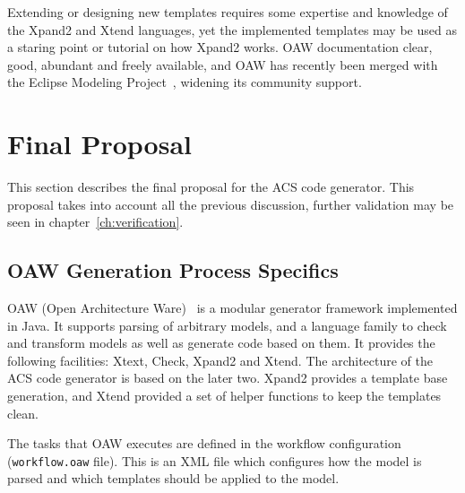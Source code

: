 Extending or designing new templates
requires some expertise and knowledge of
the Xpand2 and Xtend languages,
yet the implemented templates
may be used as a staring point or tutorial
on how Xpand2 works.
OAW documentation clear, good, abundant and freely available,
and OAW has recently been merged with the
Eclipse Modeling Project~\cite{EMF-WEB},
widening its community support.

\section{Final Proposal}
\label{sec:final-proposal}
This section describes the final proposal for the ACS code generator.
This proposal takes into account
all the previous discussion,
further validation may be seen in chapter~\ref{ch:verification}.

\subsection{OAW Generation Process Specifics}
\label{sec:oaw-specifics}
OAW (Open Architecture Ware)~%
\cite{OAW-WEB} is a modular generator framework implemented in Java.
It supports parsing of arbitrary models,
and a language family to check and transform models
as well as generate code based on them.
It provides the following facilities:
Xtext, Check, Xpand2 and Xtend.
The architecture of the ACS code generator
is based on the later two.
Xpand2 provides a template base generation,
and Xtend provided a set of helper functions
to keep the templates clean.

The tasks that OAW executes are defined in the
workflow configuration (\lstinline[language=sh]!workflow.oaw! file).
This is an XML file which configures how
the model is parsed and which templates
should be applied to the model.

